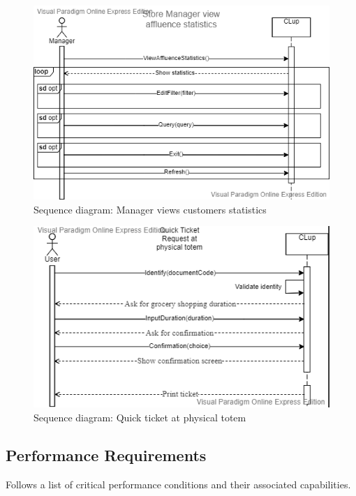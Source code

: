 \begin{figure}[H]
	\includegraphics[width=\linewidth]{../Diagrams/ViewStatistics.png}
	\caption{Sequence diagram: Manager views customers statistics}
	\label{fig:Stat}
\end{figure} 

\begin{figure}[H]
	\includegraphics[width=\linewidth]{../Diagrams/Totem.png}
	\caption{Sequence diagram: Quick ticket at physical totem}
	\label{fig:Totem}
\end{figure} 


\subsection{Performance Requirements \label{subs:performance}}
Follows a list of critical performance conditions and their associated capabilities. \newline

